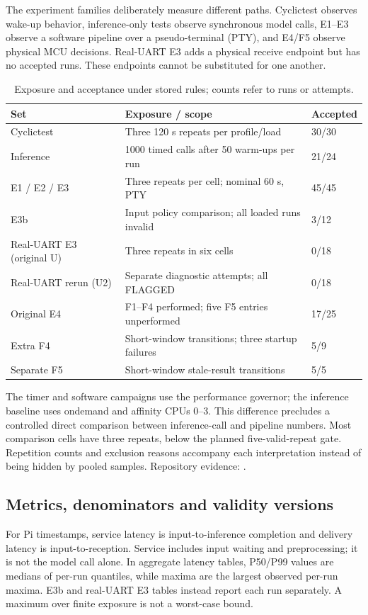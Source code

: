 \documentclass[a4paper,11pt]{article}
\newcommand{\src}[1]{{\small\color{muted}Repository evidence: \path{#1}.}}
\newcommand{\page}{\clearpage}
\begin{document}
The experiment families deliberately measure different paths. Cyclictest observes wake-up behavior, inference-only tests observe synchronous model calls, E1--E3 observe a software pipeline over a pseudo-terminal (PTY), and E4/F5 observe physical MCU decisions. Real-UART E3 adds a physical receive endpoint but has no accepted runs. These endpoints cannot be substituted for one another.
\begin{table}[H]\centering\small
\caption{Exposure and acceptance under stored rules; counts refer to runs or attempts.}\label{tab:exposure}
\begin{tabularx}{\linewidth}{lXl}\toprule Set & Exposure / scope & Accepted\\\midrule
Cyclictest & Three 120 s repeats per profile/load & 30/30\\
Inference & 1000 timed calls after 50 warm-ups per run & 21/24\\
E1 / E2 / E3 & Three repeats per cell; nominal 60 s, PTY & 45/45\\
E3b & Input policy comparison; all loaded runs invalid & 3/12\\
Real-UART E3 (original U) & Three repeats in six cells & 0/18\\
Real-UART rerun (U2) & Separate diagnostic attempts; all FLAGGED & 0/18\\
Original E4 & F1--F4 performed; five F5 entries unperformed & 17/25\\
Extra F4 & Short-window transitions; three startup failures & 5/9\\
Separate F5 & Short-window stale-result transitions & 5/5\\\bottomrule\end{tabularx}
\end{table}
The timer and software campaigns use the performance governor; the inference baseline uses ondemand and affinity CPUs 0--3. This difference precludes a controlled direct comparison between inference-call and pipeline numbers. Most comparison cells have three repeats, below the planned five-valid-repeat gate. Repetition counts and exclusion reasons accompany each interpretation instead of being hidden by pooled samples.
\src{results/README.md; docs/STAGE_REPORT.md}
\page
\subsection{Metrics, denominators and validity versions}
For Pi timestamps, service latency is input-to-inference completion and delivery latency is input-to-reception. Service includes input waiting and preprocessing; it is not the model call alone. In aggregate latency tables, P50/P99 values are medians of per-run quantiles, while maxima are the largest observed per-run maxima. E3b and real-UART E3 tables instead report each run separately. A maximum over finite exposure is not a worst-case bound.
\end{document}
